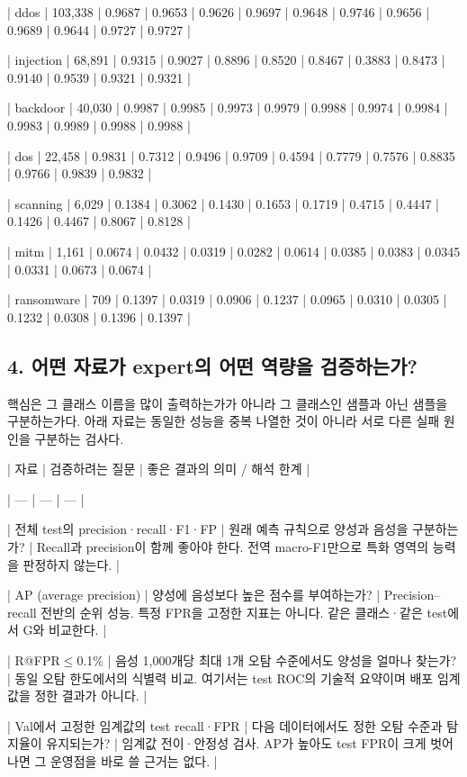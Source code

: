 | ddos | 103,338 | 0.9687 | 0.9653 | 0.9626 | 0.9697 | 0.9648 | 0.9746 | 0.9656 | 0.9689 | 0.9644 | 0.9727 | 0.9727 |

| injection | 68,891 | 0.9315 | 0.9027 | 0.8896 | 0.8520 | 0.8467 | 0.3883 | 0.8473 | 0.9140 | 0.9539 | 0.9321 | 0.9321 |

| backdoor | 40,030 | 0.9987 | 0.9985 | 0.9973 | 0.9979 | 0.9988 | 0.9974 | 0.9984 | 0.9983 | 0.9989 | 0.9988 | 0.9988 |

| dos | 22,458 | 0.9831 | 0.7312 | 0.9496 | 0.9709 | 0.4594 | 0.7779 | 0.7576 | 0.8835 | 0.9766 | 0.9839 | 0.9832 |

| scanning | 6,029 | 0.1384 | 0.3062 | 0.1430 | 0.1653 | 0.1719 | 0.4715 | 0.4447 | 0.1426 | 0.4467 | 0.8067 | 0.8128 |

| mitm | 1,161 | 0.0674 | 0.0432 | 0.0319 | 0.0282 | 0.0614 | 0.0385 | 0.0383 | 0.0345 | 0.0331 | 0.0673 | 0.0674 |

| ransomware | 709 | 0.1397 | 0.0319 | 0.0906 | 0.1237 | 0.0965 | 0.0310 | 0.0305 | 0.1232 | 0.0308 | 0.1396 | 0.1397 |

\subsection{4. 어떤 자료가 expert의 어떤 역량을 검증하는가?}
핵심은 그 클래스 이름을 많이 출력하는가가 아니라 그 클래스인 샘플과 아닌 샘플을 구분하는가다. 아래 자료는 동일한 성능을 중복 나열한 것이 아니라 서로 다른 실패 원인을 구분하는 검사다.

| 자료 | 검증하려는 질문 | 좋은 결과의 의미 /\allowbreak{} 해석 한계 |

| --- | --- | --- |

| 전체 test의 precision·recall·F1·FP | 원래 예측 규칙으로 양성과 음성을 구분하는가? | Recall과 precision이 함께 좋아야 한다. 전역 macro-F1만으로 특화 영역의 능력을 판정하지 않는다. |

| AP (average precision) | 양성에 음성보다 높은 점수를 부여하는가? | Precision–recall 전반의 순위 성능. 특정 FPR을 고정한 지표는 아니다. 같은 클래스·같은 test에서 G와 비교한다. |

| R@FPR\ensuremath{\leq}0.1\% | 음성 1,000개당 최대 1개 오탐 수준에서도 양성을 얼마나 찾는가? | 동일 오탐 한도에서의 식별력 비교. 여기서는 test ROC의 기술적 요약이며 배포 임계값을 정한 결과가 아니다. |

| Val에서 고정한 임계값의 test recall·FPR | 다음 데이터에서도 정한 오탐 수준과 탐지율이 유지되는가? | 임계값 전이·안정성 검사. AP가 높아도 test FPR이 크게 벗어나면 그 운영점을 바로 쓸 근거는 없다. |

